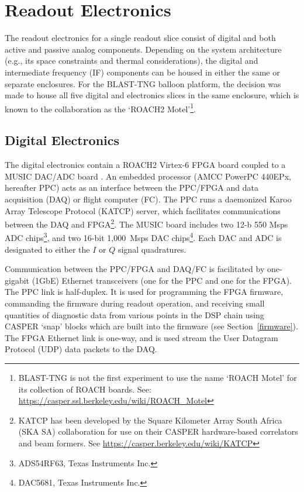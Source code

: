 \section{Readout Electronics}\label{hardware and elec}

The readout electronics for a single readout slice consist of digital and both active and passive analog components. Depending on the system architecture (e.g., its space constraints and thermal considerations), the digital and intermediate frequency (IF) components can be housed in either the same or separate enclosures. For the BLAST-TNG balloon platform, the decision was made to house all five digital and electronics slices in the same enclosure, which is known to the collaboration as the `ROACH2 Motel'\footnote{BLAST-TNG is not the first experiment to use the name `ROACH Motel' for its collection of ROACH boards. See: \url{https://casper.ssl.berkeley.edu/wiki/ROACH_Motel}}.

\subsection{Digital Electronics}\label{digital electronics}

The digital electronics contain a ROACH2 Virtex-6 FPGA board coupled to a MUSIC DAC/ADC board \citep{duan2010open}. An embedded processor (AMCC PowerPC 440EPx, hereafter PPC) acts as an interface between the PPC/FPGA and data acquisition (DAQ) or flight computer (FC). The PPC runs a daemonized Karoo Array Telescope Protocol (KATCP) server, which facilitates communications between the DAQ and FPGA\footnote{KATCP has been developed by the Square Kilometer Array South Africa (SKA SA) collaboration for use on their CASPER hardware-based correlators and beam formers. See
\url{https://casper.berkeley.edu/wiki/KATCP}}. The MUSIC board includes two 12-b 550 Msps ADC chips\footnote{ADS54RF63, Texas Instruments Inc.}, and two 16-bit 1,000~Msps DAC chips\footnote{DAC5681, Texas Instruments Inc.}. Each DAC and ADC is designated to either the $I$ or $Q$ signal quadratures.

Communication between the PPC/FPGA and DAQ/FC is facilitated by one-gigabit (1GbE) Ethernet transceivers (one for the PPC and one for the FPGA). The PPC link is half-duplex. It is used for programming the FPGA firmware, commanding the firmware during readout operation, and receiving small quantities of diagnostic data from various points in the DSP chain using CASPER `snap' blocks which are built into the firmware (see Section~\ref{firmware}). The FPGA Ethernet link is one-way, and is used stream the User Datagram Protocol (UDP) data packets to the DAQ\@.

